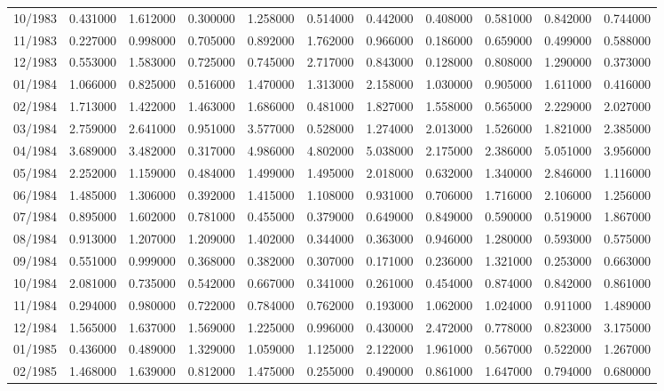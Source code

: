 \begin{tabular}{lrrrrrrrrrr}
10/1983 & 0.431000 & 1.612000 & 0.300000 & 1.258000 & 0.514000 & 0.442000 & 0.408000 & 0.581000 & 0.842000 & 0.744000 \\
11/1983 & 0.227000 & 0.998000 & 0.705000 & 0.892000 & 1.762000 & 0.966000 & 0.186000 & 0.659000 & 0.499000 & 0.588000 \\
12/1983 & 0.553000 & 1.583000 & 0.725000 & 0.745000 & 2.717000 & 0.843000 & 0.128000 & 0.808000 & 1.290000 & 0.373000 \\
01/1984 & 1.066000 & 0.825000 & 0.516000 & 1.470000 & 1.313000 & 2.158000 & 1.030000 & 0.905000 & 1.611000 & 0.416000 \\
02/1984 & 1.713000 & 1.422000 & 1.463000 & 1.686000 & 0.481000 & 1.827000 & 1.558000 & 0.565000 & 2.229000 & 2.027000 \\
03/1984 & 2.759000 & 2.641000 & 0.951000 & 3.577000 & 0.528000 & 1.274000 & 2.013000 & 1.526000 & 1.821000 & 2.385000 \\
04/1984 & 3.689000 & 3.482000 & 0.317000 & 4.986000 & 4.802000 & 5.038000 & 2.175000 & 2.386000 & 5.051000 & 3.956000 \\
05/1984 & 2.252000 & 1.159000 & 0.484000 & 1.499000 & 1.495000 & 2.018000 & 0.632000 & 1.340000 & 2.846000 & 1.116000 \\
06/1984 & 1.485000 & 1.306000 & 0.392000 & 1.415000 & 1.108000 & 0.931000 & 0.706000 & 1.716000 & 2.106000 & 1.256000 \\
07/1984 & 0.895000 & 1.602000 & 0.781000 & 0.455000 & 0.379000 & 0.649000 & 0.849000 & 0.590000 & 0.519000 & 1.867000 \\
08/1984 & 0.913000 & 1.207000 & 1.209000 & 1.402000 & 0.344000 & 0.363000 & 0.946000 & 1.280000 & 0.593000 & 0.575000 \\
09/1984 & 0.551000 & 0.999000 & 0.368000 & 0.382000 & 0.307000 & 0.171000 & 0.236000 & 1.321000 & 0.253000 & 0.663000 \\
10/1984 & 2.081000 & 0.735000 & 0.542000 & 0.667000 & 0.341000 & 0.261000 & 0.454000 & 0.874000 & 0.842000 & 0.861000 \\
11/1984 & 0.294000 & 0.980000 & 0.722000 & 0.784000 & 0.762000 & 0.193000 & 1.062000 & 1.024000 & 0.911000 & 1.489000 \\
12/1984 & 1.565000 & 1.637000 & 1.569000 & 1.225000 & 0.996000 & 0.430000 & 2.472000 & 0.778000 & 0.823000 & 3.175000 \\
01/1985 & 0.436000 & 0.489000 & 1.329000 & 1.059000 & 1.125000 & 2.122000 & 1.961000 & 0.567000 & 0.522000 & 1.267000 \\
02/1985 & 1.468000 & 1.639000 & 0.812000 & 1.475000 & 0.255000 & 0.490000 & 0.861000 & 1.647000 & 0.794000 & 0.680000 \\

\end{tabular}
